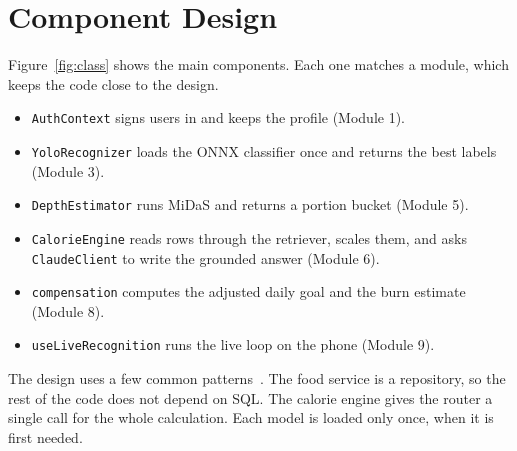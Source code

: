\section{Component Design}
Figure~\ref{fig:class} shows the main components. Each one matches a module, which keeps the code close
to the design.
\begin{itemize}[noitemsep]
  \item \texttt{AuthContext} signs users in and keeps the profile (Module 1).
  \item \texttt{YoloRecognizer} loads the ONNX classifier once and returns the best labels (Module 3).
  \item \texttt{DepthEstimator} runs MiDaS and returns a portion bucket (Module 5).
  \item \texttt{CalorieEngine} reads rows through the retriever, scales them, and asks \texttt{ClaudeClient}
        to write the grounded answer (Module 6).
  \item \texttt{compensation} computes the adjusted daily goal and the burn estimate (Module 8).
  \item \texttt{useLiveRecognition} runs the live loop on the phone (Module 9).
\end{itemize}
The design uses a few common patterns~\cite{interface_1}. The food service is a repository, so the rest
of the code does not depend on SQL. The calorie engine gives the router a single call for the whole
calculation. Each model is loaded only once, when it is first needed.

